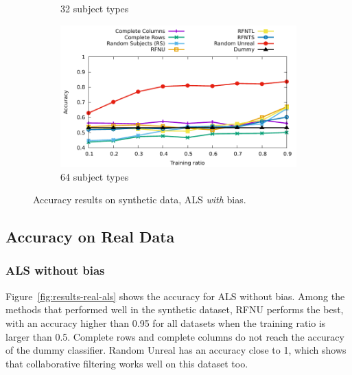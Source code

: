 \documentclass[10pt, conference, compsocconf]{IEEEtran}
\begin{document}
\begin{figure}
\begin{subfigure}[b]{\columnwidth}
        \caption{32 subject types}
\end{subfigure}
\hfill
\begin{subfigure}[b]{\columnwidth}
        \includegraphics[width=0.8\columnwidth]{data/results/means_of_results/ALS-Bias/Synthetic/synthetic_subject_types/ALS-Bias-64-types.pdf}
        \caption{64 subject types}
\end{subfigure}
\caption{Accuracy results on synthetic data, ALS \emph{with} bias.}
\label{fig:results-synthetic-als-bias}
\end{figure}

\subsection{Accuracy on  Real Data}

\subsubsection{ALS without bias}

Figure~\ref{fig:results-real-als} shows the accuracy for ALS without bias. Among the methods that performed 
well in the synthetic dataset, RFNU performs the best, with an accuracy 
higher than 0.95 for all datasets when the training ratio is larger 
than 0.5. Complete rows and complete columns do not reach the accuracy of 
the dummy classifier. Random Unreal has an 
accuracy close to 1, which shows that collaborative filtering works 
well on this dataset too.
\end{document}
